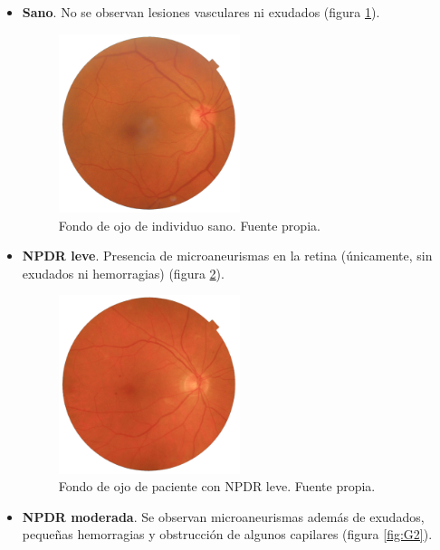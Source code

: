 \begin{itemize}[itemsep=0.25em]
    \item \textbf{Sano}. No se observan lesiones vasculares ni exudados (figura \ref{fig:G0}).

    \begin{figure}[h]
        \centering
        \includegraphics[width=0.5\textwidth]{img/G0.png}
        \caption{Fondo de ojo de individuo sano. Fuente propia.}
        \label{fig:G0}
    \end{figure}
    
    \item \textbf{NPDR leve}. Presencia de microaneurismas en la retina (únicamente, sin exudados ni hemorragias) (figura \ref{fig:G1}).

    \begin{figure}[h]
        \centering
        \includegraphics[width=0.5\textwidth]{img/G1.png}
        \caption{Fondo de ojo de paciente con NPDR leve. Fuente propia.}
        \label{fig:G1}
    \end{figure}
    
    \item \textbf{NPDR moderada}. Se observan microaneurismas además de exudados, pequeñas hemorragias y obstrucción de algunos capilares (figura \ref{fig:G2}).


\end{itemize}
